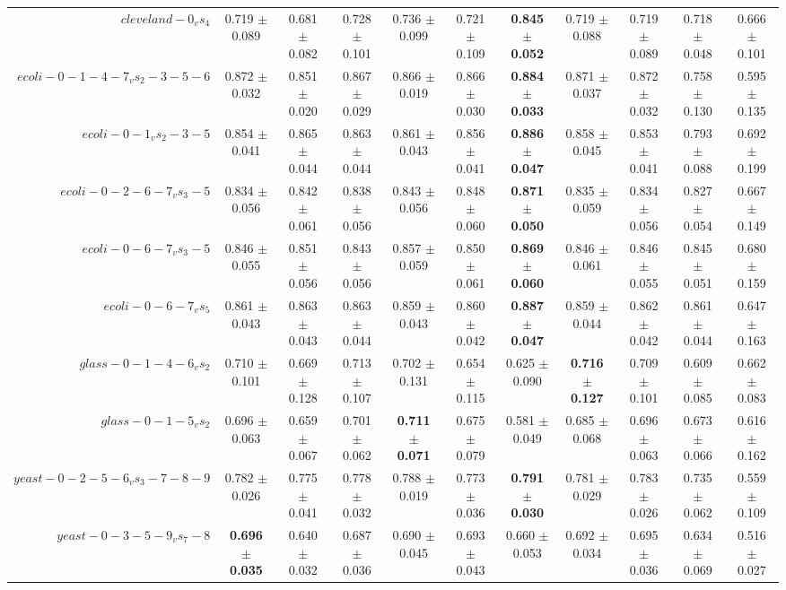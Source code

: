 \begin{table}[!ht]
{\begin{tabular}{r c c c c c c c c c c}
$cleveland-0_vs_4$ & 0.719 $\pm$ 0.089 & 0.681 $\pm$ 0.082 & 0.728 $\pm$ 0.101 & 0.736 $\pm$ 0.099 & 0.721 $\pm$ 0.109 & \textbf{0.845 $\pm$ 0.052} & 0.719 $\pm$ 0.088 & 0.719 $\pm$ 0.089 & 0.718 $\pm$ 0.048 & 0.666 $\pm$ 0.101 \\
$ecoli-0-1-4-7_vs_2-3-5-6$ & 0.872 $\pm$ 0.032 & 0.851 $\pm$ 0.020 & 0.867 $\pm$ 0.029 & 0.866 $\pm$ 0.019 & 0.866 $\pm$ 0.030 & \textbf{0.884 $\pm$ 0.033} & 0.871 $\pm$ 0.037 & 0.872 $\pm$ 0.032 & 0.758 $\pm$ 0.130 & 0.595 $\pm$ 0.135 \\
$ecoli-0-1_vs_2-3-5$ & 0.854 $\pm$ 0.041 & 0.865 $\pm$ 0.044 & 0.863 $\pm$ 0.044 & 0.861 $\pm$ 0.043 & 0.856 $\pm$ 0.041 & \textbf{0.886 $\pm$ 0.047} & 0.858 $\pm$ 0.045 & 0.853 $\pm$ 0.041 & 0.793 $\pm$ 0.088 & 0.692 $\pm$ 0.199 \\
$ecoli-0-2-6-7_vs_3-5$ & 0.834 $\pm$ 0.056 & 0.842 $\pm$ 0.061 & 0.838 $\pm$ 0.056 & 0.843 $\pm$ 0.056 & 0.848 $\pm$ 0.060 & \textbf{0.871 $\pm$ 0.050} & 0.835 $\pm$ 0.059 & 0.834 $\pm$ 0.056 & 0.827 $\pm$ 0.054 & 0.667 $\pm$ 0.149 \\
$ecoli-0-6-7_vs_3-5$ & 0.846 $\pm$ 0.055 & 0.851 $\pm$ 0.056 & 0.843 $\pm$ 0.056 & 0.857 $\pm$ 0.059 & 0.850 $\pm$ 0.061 & \textbf{0.869 $\pm$ 0.060} & 0.846 $\pm$ 0.061 & 0.846 $\pm$ 0.055 & 0.845 $\pm$ 0.051 & 0.680 $\pm$ 0.159 \\
$ecoli-0-6-7_vs_5$ & 0.861 $\pm$ 0.043 & 0.863 $\pm$ 0.043 & 0.863 $\pm$ 0.044 & 0.859 $\pm$ 0.043 & 0.860 $\pm$ 0.042 & \textbf{0.887 $\pm$ 0.047} & 0.859 $\pm$ 0.044 & 0.862 $\pm$ 0.042 & 0.861 $\pm$ 0.044 & 0.647 $\pm$ 0.163 \\
$glass-0-1-4-6_vs_2$ & 0.710 $\pm$ 0.101 & 0.669 $\pm$ 0.128 & 0.713 $\pm$ 0.107 & 0.702 $\pm$ 0.131 & 0.654 $\pm$ 0.115 & 0.625 $\pm$ 0.090 & \textbf{0.716 $\pm$ 0.127} & 0.709 $\pm$ 0.101 & 0.609 $\pm$ 0.085 & 0.662 $\pm$ 0.083 \\
$glass-0-1-5_vs_2$ & 0.696 $\pm$ 0.063 & 0.659 $\pm$ 0.067 & 0.701 $\pm$ 0.062 & \textbf{0.711 $\pm$ 0.071} & 0.675 $\pm$ 0.079 & 0.581 $\pm$ 0.049 & 0.685 $\pm$ 0.068 & 0.696 $\pm$ 0.063 & 0.673 $\pm$ 0.066 & 0.616 $\pm$ 0.162 \\
$yeast-0-2-5-6_vs_3-7-8-9$ & 0.782 $\pm$ 0.026 & 0.775 $\pm$ 0.041 & 0.778 $\pm$ 0.032 & 0.788 $\pm$ 0.019 & 0.773 $\pm$ 0.036 & \textbf{0.791 $\pm$ 0.030} & 0.781 $\pm$ 0.029 & 0.783 $\pm$ 0.026 & 0.735 $\pm$ 0.062 & 0.559 $\pm$ 0.109 \\
$yeast-0-3-5-9_vs_7-8$ & \textbf{0.696 $\pm$ 0.035} & 0.640 $\pm$ 0.032 & 0.687 $\pm$ 0.036 & 0.690 $\pm$ 0.045 & 0.693 $\pm$ 0.043 & 0.660 $\pm$ 0.053 & 0.692 $\pm$ 0.034 & 0.695 $\pm$ 0.036 & 0.634 $\pm$ 0.069 & 0.516 $\pm$ 0.027 \\

\end{tabular}}
\end{table}
